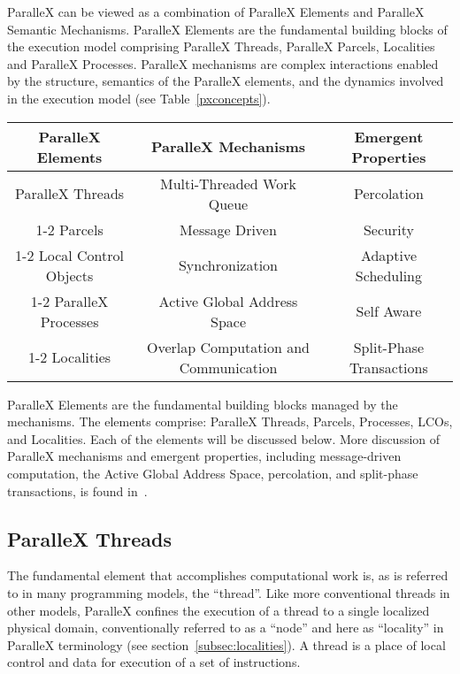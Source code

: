 \documentclass[floatfix]{revtex4}
\begin{document}
ParalleX can be viewed as a combination
of ParalleX Elements and ParalleX Semantic Mechanisms. ParalleX Elements
are the fundamental building blocks of the execution model comprising
ParalleX Threads, ParalleX Parcels, Localities and ParalleX Processes.
ParalleX mechanisms are complex interactions enabled by the structure,
semantics of the ParalleX elements, and the dynamics involved in the
execution model (see Table~\ref{pxconcepts}).

\begin{center}
\begin{table*}[htbp]
   \centering
      \caption{ParalleX Concepts Summary}
   \label{pxconcepts}
\begin{tabular}{|c|c||c|}
\hline \textbf{ParalleX Elements} & \textbf{ParalleX Mechanisms} & \textbf{Emergent Properties} \\
\hline ParalleX Threads & Multi-Threaded Work Queue & Percolation \\
\cline{1-2} Parcels & Message Driven & Security \\
\cline{1-2} Local Control Objects & Synchronization & Adaptive Scheduling\\
\cline{1-2} ParalleX Processes & Active Global Address Space & Self Aware \\
\cline{1-2} Localities & Overlap Computation and Communication & Split-Phase Transactions \\
\hline
\end{tabular}
\end{table*}
\end{center}


ParalleX Elements are the fundamental building blocks managed by the
mechanisms. The elements comprise: ParalleX Threads, Parcels, Processes,
LCOs, and Localities. Each of the elements will be discussed below. 
More discussion of ParalleX mechanisms and emergent properties, including message-driven 
computation, the Active Global Address Space, percolation, 
and split-phase transactions, is found in~\cite{chiragsthesis}.

\subsection{ParalleX Threads}
\label{sec_pxthreads}
The fundamental element that accomplishes computational work is, as is referred to in many programming models,
the ``thread''. Like more conventional threads in other models, ParalleX
confines the execution of a thread to a single localized physical domain,
conventionally referred to as a ``node'' and here as ``locality'' in ParalleX
terminology (see section~\ref{subsec:localities}). A thread is a place of local control and data for execution
of a set of instructions.
\end{document}
